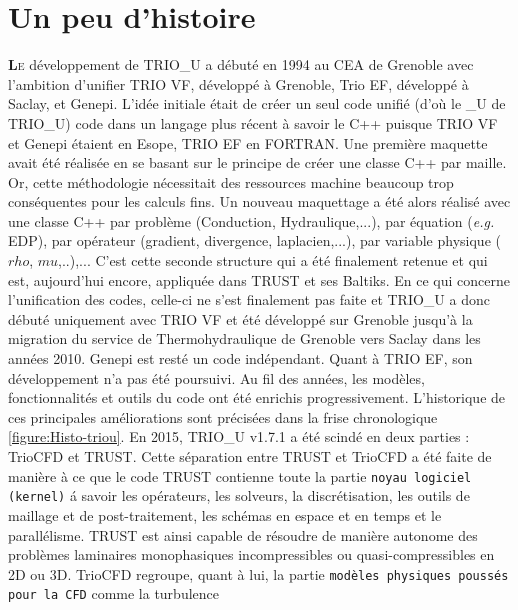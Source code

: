 \chapter{Un peu d'histoire}

\lettrine[lines=2,slope=0pt,nindent=4pt]{\textbf{L}}{e} d\'eveloppement de TRIO\_U a d\'ebut\'e en 1994 au CEA de Grenoble avec l'ambition d'unifier TRIO VF, d\'evelopp\'e \`a Grenoble, Trio EF, d\'evelopp\'e \`a Saclay, et Genepi.\smallskip\newline
L'id\'ee initiale \'etait de cr\'eer un seul code unifi\'e (d'o\`u le \_U de TRIO\_U) code dans un langage plus r\'ecent \`a savoir le C++ puisque TRIO VF et Genepi \'etaient en Esope, TRIO EF en FORTRAN. Une premi\`ere maquette avait \'et\'e réalisée en se basant
sur le principe de cr\'eer une classe C++ par maille. Or, cette m\'ethodologie nécessitait des ressources machine beaucoup trop cons\'equentes pour les calculs fins. Un nouveau maquettage a \'et\'e alors réalisé avec une classe C++ par probl\`eme (Conduction, Hydraulique,...), par \'equation (\textit{e.g.} EDP), par op\'erateur (gradient, divergence, laplacien,...), par variable physique ($rho$, $mu$,..),... C'est cette seconde structure qui a \'et\'e finalement retenue et qui est, aujourd'hui encore, appliqu\'ee dans TRUST et ses Baltiks.\smallskip\newline
En ce qui concerne l'unification des codes, celle-ci ne s'est finalement pas faite et TRIO\_U a donc d\'ebut\'e uniquement avec TRIO VF et été d\'evelopp\'e sur Grenoble jusqu'\`a la migration du service de Thermohydraulique de Grenoble vers Saclay dans les ann\'ees 2010. Genepi est rest\'e un code ind\'ependant. Quant \`a TRIO EF, son d\'eveloppement n'a pas \'et\'e poursuivi.\smallskip\newline
Au fil des ann\'ees, les mod\`eles, fonctionnalit\'es et outils du code ont \'et\'e enrichis progressivement. L'historique de ces principales am\'eliorations sont pr\'ecis\'ees dans la frise chronologique \ref{figure:Histo-triou}.\smallskip\newline
En 2015, TRIO\_U v1.7.1 a \'et\'e scind\'e en deux parties : TrioCFD et TRUST. 
Cette s\'eparation entre TRUST et TrioCFD a \'et\'e faite de mani\`ere à ce que le code TRUST contienne toute la partie \texttt{noyau logiciel (kernel)} \'a savoir les op\'erateurs, les solveurs, la discr\'etisation, les outils de maillage et de post-traitement, les sch\'emas en espace et en temps et le parall\'elisme. TRUST est ainsi capable de r\'esoudre de mani\`ere autonome des probl\`emes laminaires monophasiques incompressibles ou quasi-compressibles en 2D ou 3D. TrioCFD regroupe, quant \`a lui, la partie \texttt{mod\`eles physiques pouss\'es pour la CFD} comme la turbulence
